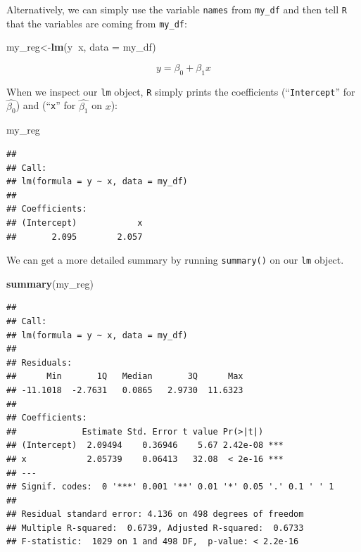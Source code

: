 \documentclass[]{book}
\newenvironment{Shaded}{\begin{snugshade}}{\end{snugshade}}
\newcommand{\KeywordTok}[1]{\textcolor[rgb]{0.13,0.29,0.53}{\textbf{#1}}}
\newcommand{\DataTypeTok}[1]{\textcolor[rgb]{0.13,0.29,0.53}{#1}}
\newcommand{\OperatorTok}[1]{\textcolor[rgb]{0.81,0.36,0.00}{\textbf{#1}}}
\newcommand{\NormalTok}[1]{#1}
\theoremstyle{definition}
\theoremstyle{definition}
\theoremstyle{definition}
\theoremstyle{remark}
\begin{document}
\begin{Shaded}
\end{Shaded}

Alternatively, we can simply use the variable \texttt{names} from
\texttt{my\_df} and then tell \texttt{R} that the variables are coming
from \texttt{my\_df}:

\begin{Shaded}
\begin{Highlighting}[]
\NormalTok{my_reg<-}\KeywordTok{lm}\NormalTok{(y}\OperatorTok{~}\NormalTok{x, }\DataTypeTok{data =}\NormalTok{ my_df)}
\end{Highlighting}
\end{Shaded}

\[y=\beta_0+\beta_1 x\]

When we inspect our \texttt{lm} object, \texttt{R} simply prints the
coefficients (``\texttt{Intercept}'' for \(\hat{\beta_0}\)) and
(``\texttt{x}'' for \(\hat{\beta_1}\) on \(x\)):

\begin{Shaded}
\begin{Highlighting}[]
\NormalTok{my_reg}
\end{Highlighting}
\end{Shaded}

\begin{verbatim}
## 
## Call:
## lm(formula = y ~ x, data = my_df)
## 
## Coefficients:
## (Intercept)            x  
##       2.095        2.057
\end{verbatim}

We can get a more detailed summary by running \texttt{summary()} on our
\texttt{lm} object.

\begin{Shaded}
\begin{Highlighting}[]
\KeywordTok{summary}\NormalTok{(my_reg)}
\end{Highlighting}
\end{Shaded}

\begin{verbatim}
## 
## Call:
## lm(formula = y ~ x, data = my_df)
## 
## Residuals:
##      Min       1Q   Median       3Q      Max 
## -11.1018  -2.7631   0.0865   2.9730  11.6323 
## 
## Coefficients:
##             Estimate Std. Error t value Pr(>|t|)    
## (Intercept)  2.09494    0.36946    5.67 2.42e-08 ***
## x            2.05739    0.06413   32.08  < 2e-16 ***
## ---
## Signif. codes:  0 '***' 0.001 '**' 0.01 '*' 0.05 '.' 0.1 ' ' 1
## 
## Residual standard error: 4.136 on 498 degrees of freedom
## Multiple R-squared:  0.6739, Adjusted R-squared:  0.6733 
## F-statistic:  1029 on 1 and 498 DF,  p-value: < 2.2e-16
\end{verbatim}
\end{document}
